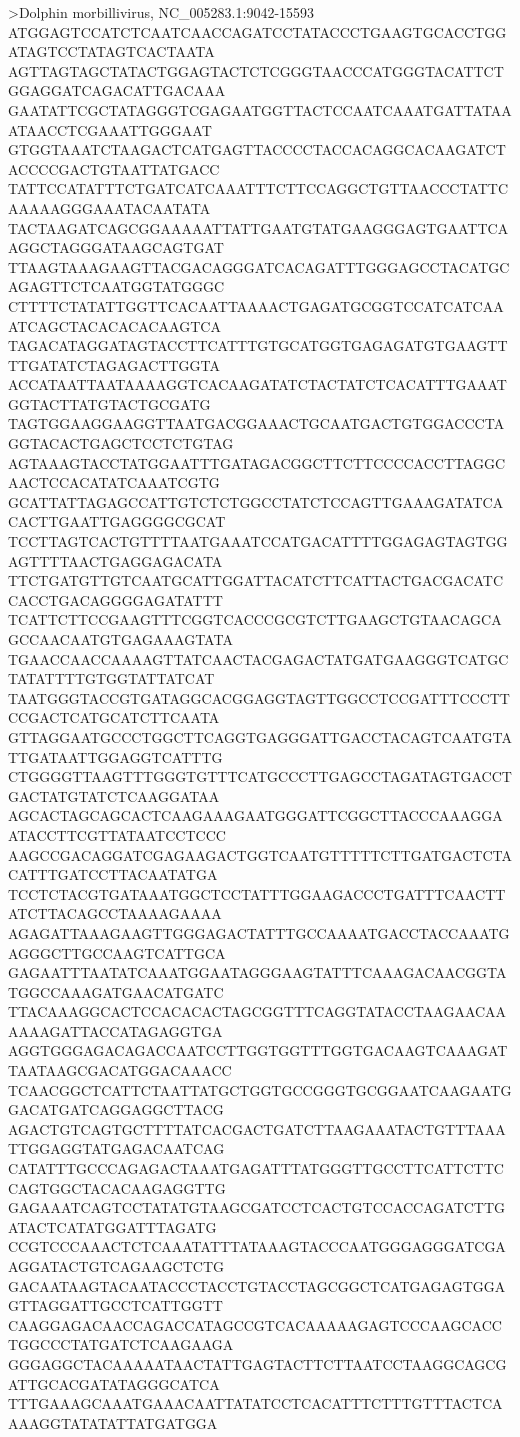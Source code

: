 >Dolphin morbillivirus, NC_005283.1:9042-15593  
ATGGAGTCCATCTCAATCAACCAGATCCTATACCCTGAAGTGCACCTGGATAGTCCTATAGTCACTAATA
AGTTAGTAGCTATACTGGAGTACTCTCGGGTAACCCATGGGTACATTCTGGAGGATCAGACATTGACAAA
GAATATTCGCTATAGGGTCGAGAATGGTTACTCCAATCAAATGATTATAAATAACCTCGAAATTGGGAAT
GTGGTAAATCTAAGACTCATGAGTTACCCCTACCACAGGCACAAGATCTACCCCGACTGTAATTATGACC
TATTCCATATTTCTGATCATCAAATTTCTTCCAGGCTGTTAACCCTATTCAAAAAGGGAAATACAATATA
TACTAAGATCAGCGGAAAAATTATTGAATGTATGAAGGGAGTGAATTCAAGGCTAGGGATAAGCAGTGAT
TTAAGTAAAGAAGTTACGACAGGGATCACAGATTTGGGAGCCTACATGCAGAGTTCTCAATGGTATGGGC
CTTTTCTATATTGGTTCACAATTAAAACTGAGATGCGGTCCATCATCAAATCAGCTACACACACAAGTCA
TAGACATAGGATAGTACCTTCATTTGTGCATGGTGAGAGATGTGAAGTTTTGATATCTAGAGACTTGGTA
ACCATAATTAATAAAAGGTCACAAGATATCTACTATCTCACATTTGAAATGGTACTTATGTACTGCGATG
TAGTGGAAGGAAGGTTAATGACGGAAACTGCAATGACTGTGGACCCTAGGTACACTGAGCTCCTCTGTAG
AGTAAAGTACCTATGGAATTTGATAGACGGCTTCTTCCCCACCTTAGGCAACTCCACATATCAAATCGTG
GCATTATTAGAGCCATTGTCTCTGGCCTATCTCCAGTTGAAAGATATCACACTTGAATTGAGGGGCGCAT
TCCTTAGTCACTGTTTTAATGAAATCCATGACATTTTGGAGAGTAGTGGAGTTTTAACTGAGGAGACATA
TTCTGATGTTGTCAATGCATTGGATTACATCTTCATTACTGACGACATCCACCTGACAGGGGAGATATTT
TCATTCTTCCGAAGTTTCGGTCACCCGCGTCTTGAAGCTGTAACAGCAGCCAACAATGTGAGAAAGTATA
TGAACCAACCAAAAGTTATCAACTACGAGACTATGATGAAGGGTCATGCTATATTTTGTGGTATTATCAT
TAATGGGTACCGTGATAGGCACGGAGGTAGTTGGCCTCCGATTTCCCTTCCGACTCATGCATCTTCAATA
GTTAGGAATGCCCTGGCTTCAGGTGAGGGATTGACCTACAGTCAATGTATTGATAATTGGAGGTCATTTG
CTGGGGTTAAGTTTGGGTGTTTCATGCCCTTGAGCCTAGATAGTGACCTGACTATGTATCTCAAGGATAA
AGCACTAGCAGCACTCAAGAAAGAATGGGATTCGGCTTACCCAAAGGAATACCTTCGTTATAATCCTCCC
AAGCCGACAGGATCGAGAAGACTGGTCAATGTTTTTCTTGATGACTCTACATTTGATCCTTACAATATGA
TCCTCTACGTGATAAATGGCTCCTATTTGGAAGACCCTGATTTCAACTTATCTTACAGCCTAAAAGAAAA
AGAGATTAAAGAAGTTGGGAGACTATTTGCCAAAATGACCTACCAAATGAGGGCTTGCCAAGTCATTGCA
GAGAATTTAATATCAAATGGAATAGGGAAGTATTTCAAAGACAACGGTATGGCCAAAGATGAACATGATC
TTACAAAGGCACTCCACACACTAGCGGTTTCAGGTATACCTAAGAACAAAAAAGATTACCATAGAGGTGA
AGGTGGGAGACAGACCAATCCTTGGTGGTTTGGTGACAAGTCAAAGATTAATAAGCGACATGGACAAACC
TCAACGGCTCATTCTAATTATGCTGGTGCCGGGTGCGGAATCAAGAATGGACATGATCAGGAGGCTTACG
AGACTGTCAGTGCTTTTATCACGACTGATCTTAAGAAATACTGTTTAAATTGGAGGTATGAGACAATCAG
CATATTTGCCCAGAGACTAAATGAGATTTATGGGTTGCCTTCATTCTTCCAGTGGCTACACAAGAGGTTG
GAGAAATCAGTCCTATATGTAAGCGATCCTCACTGTCCACCAGATCTTGATACTCATATGGATTTAGATG
CCGTCCCAAACTCTCAAATATTTATAAAGTACCCAATGGGAGGGATCGAAGGATACTGTCAGAAGCTCTG
GACAATAAGTACAATACCCTACCTGTACCTAGCGGCTCATGAGAGTGGAGTTAGGATTGCCTCATTGGTT
CAAGGAGACAACCAGACCATAGCCGTCACAAAAAGAGTCCCAAGCACCTGGCCCTATGATCTCAAGAAGA
GGGAGGCTACAAAAATAACTATTGAGTACTTCTTAATCCTAAGGCAGCGATTGCACGATATAGGGCATCA
TTTGAAAGCAAATGAAACAATTATATCCTCACATTTCTTTGTTTACTCAAAAGGTATATATTATGATGGA
